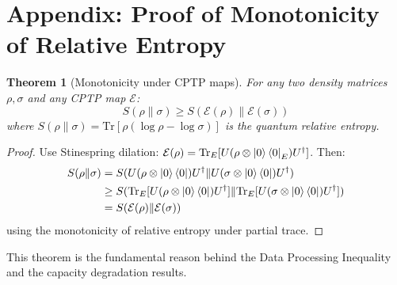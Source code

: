 \documentclass[12pt]{article}
\newtheorem{theorem}{Theorem}
\begin{document}
\section*{Appendix: Proof of Monotonicity of Relative Entropy}

\begin{theorem}[Monotonicity under CPTP maps]
For any two density matrices $\rho, \sigma$ and any CPTP map $\mathcal{E}$:
\[
S(\rho \| \sigma) \geq S(\mathcal{E}(\rho) \| \mathcal{E}(\sigma))
\]
where $S(\rho \| \sigma) = \text{Tr}[\rho(\log \rho - \log \sigma)]$ is the quantum relative entropy.
\end{theorem}

\begin{proof}
Use Stinespring dilation: $\mathcal{E}(\rho) = \text{Tr}_E[U(\rho \otimes \ket{0}\bra{0}_E)U^\dagger]$. Then:
\begin{align*}
S(\rho \| \sigma) &= S(U(\rho \otimes \ket{0}\bra{0})U^\dagger \| U(\sigma \otimes \ket{0}\bra{0})U^\dagger) \\
&\geq S(\text{Tr}_E[U(\rho \otimes \ket{0}\bra{0})U^\dagger] \| \text{Tr}_E[U(\sigma \otimes \ket{0}\bra{0})U^\dagger]) \\
&= S(\mathcal{E}(\rho) \| \mathcal{E}(\sigma))
\end{align*}
using the monotonicity of relative entropy under partial trace.
\end{proof}

This theorem is the fundamental reason behind the Data Processing Inequality and the capacity degradation results.
\end{document}
